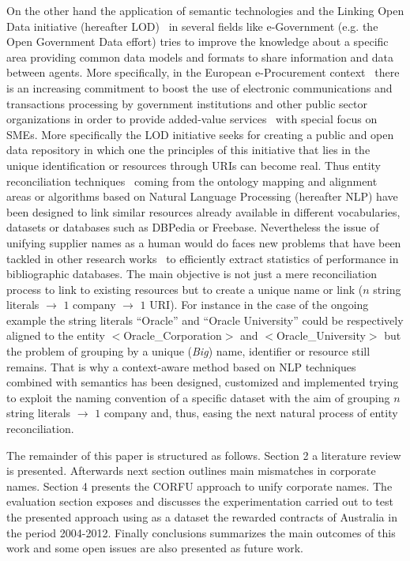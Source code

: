 \documentclass{llncs}
\begin{document}
On the other hand the application of semantic technologies and the Linking Open Data initiative (hereafter LOD)~\cite{Berners-Lee-2006,Heath_Bizer_2011}  
in several fields like e-Government (e.g. the Open Government Data effort) tries to improve the knowledge about a specific area providing 
common data models and formats to share information and data between agents. More specifically, in the European e-Procurement 
context~\cite{e-Proc-map-paper} there is an increasing commitment to boost the use of electronic communications and transactions 
processing by government institutions and other public sector organizations in order to provide added-value services~\cite{orgsODBook} 
with special focus on SMEs. More specifically the LOD initiative seeks for creating a public and open data repository in which one the principles of this initiative that lies in the 
unique identification or resources through URIs can become real. Thus entity reconciliation techniques~\cite{Serimi,conf/www/MaaliCP11} 
coming from the ontology mapping and alignment areas or algorithms based on Natural Language Processing (hereafter NLP) have been 
designed to link similar resources already available in different vocabularies, datasets or databases such as DBPedia or Freebase. 
Nevertheless the issue of unifying supplier names as a human would do faces new problems that have been tackled in 
other research works~\cite{Galvez2006} to efficiently extract statistics of performance in bibliographic databases. The main objective is not just a 
mere reconciliation process to link to existing resources but to create a unique name or link ($n$ string literals $\to$ $1$ company $\to$ $1$ URI). 
For instance in the case of the ongoing example the string literals ``Oracle'' and ``Oracle University'' could be respectively aligned to the entity $<$Oracle\_Corporation$>$ and $<$Oracle\_University$>$ but 
the problem of grouping by a unique (\textit{Big}) name, identifier or resource still remains. That is why a context-aware method based on NLP 
techniques combined with semantics has been designed, customized and implemented trying to exploit the naming convention of a specific dataset with the aim 
of grouping $n$ string literals $\to$ $1$ company and, thus, easing the next natural process of entity reconciliation.

The remainder of this paper is structured as follows. Section 2 a literature review is presented. Afterwards next section outlines main mismatches in corporate names. Section 4 presents 
the CORFU approach to unify corporate names. The evaluation section exposes and discusses the experimentation carried out to test the presented approach using as a dataset the rewarded 
contracts of Australia in the period 2004-2012. Finally conclusions summarizes the main outcomes of this work 
and some open issues are also presented as future work.
\end{document}

